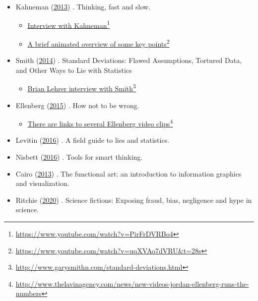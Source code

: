 \documentclass[
  10pt,
  b5paper]{book}
\providecommand{\tightlist}{%
  \setlength{\itemsep}{0pt}\setlength{\parskip}{0pt}}
\begin{document}
\begin{itemize}
\tightlist
\item
  Kahneman (\protect\hyperlink{ref-kahneman_2013}{2013}) . Thinking, fast and slow.

  \begin{itemize}
  \tightlist
  \item
    \href{https://www.youtube.com/watch?v=PirFrDVRBo4}{Interview with Kahneman}\footnote{\url{https://www.youtube.com/watch?v=PirFrDVRBo4}}
  \item
    \href{https://www.youtube.com/watch?v=uqXVAo7dVRU\&t=28s}{A brief animated overview of some key points}\footnote{\url{https://www.youtube.com/watch?v=uqXVAo7dVRU\&t=28s}}
  \end{itemize}
\item
  Smith (\protect\hyperlink{ref-smith-sd}{2014}) . Standard Deviations: Flawed Assumptions, Tortured Data, and Other Ways to Lie with Statistics

  \begin{itemize}
  \tightlist
  \item
    \href{http://www.garysmithn.com/standard-deviations.html}{Brian Lehrer interview with Smith}\footnote{\url{http://www.garysmithn.com/standard-deviations.html}}
  \end{itemize}
\item
  Ellenberg (\protect\hyperlink{ref-ellenberg_2015}{2015}) . How not to be wrong.

  \begin{itemize}
  \tightlist
  \item
    \href{http://www.thelavinagency.com/news/new-videos-jordan-ellenberg-runs-the-numbers}{There are links to several Ellenberg video clips}\footnote{\url{http://www.thelavinagency.com/news/new-videos-jordan-ellenberg-runs-the-numbers}}
  \end{itemize}
\item
  Levitin (\protect\hyperlink{ref-levitin_2016}{2016}) . A field guide to lies and statistics.
\item
  Nisbett (\protect\hyperlink{ref-nisbett}{2016}) . Tools for smart thinking.
\item
  Cairo (\protect\hyperlink{ref-cairo_2013}{2013}) . The functional art: an introduction to information
  graphics and visualization.
\item
  Ritchie (\protect\hyperlink{ref-ritchie2020science}{2020}) . Science fictions: Exposing fraud, bias,
  negligence and hype in science.
\end{itemize}
\end{document}
